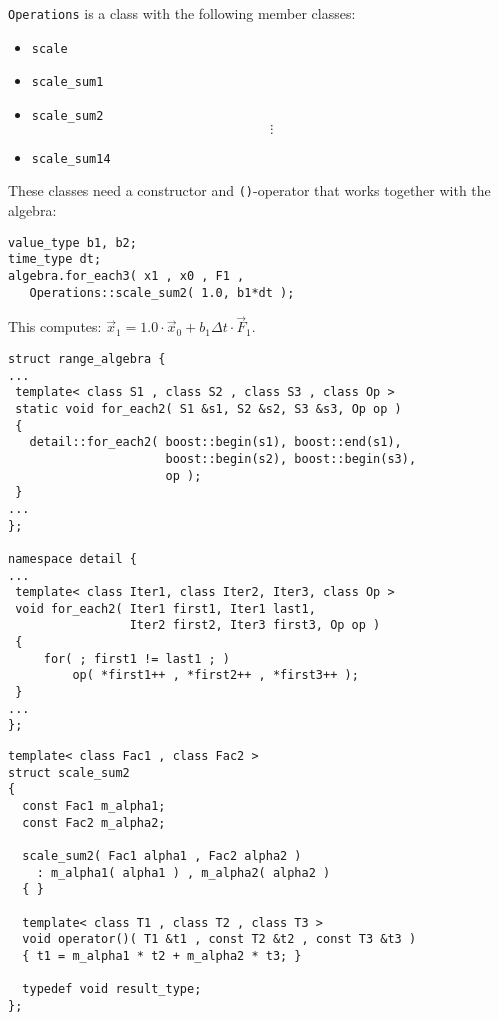 \begin{frame}[fragile]

\lstinline+Operations+ is a class with the following member classes:
\begin{itemize}
 \item \lstinline+scale+
 \item \lstinline+scale_sum1+
 \item \lstinline+scale_sum2+
\[ \vdots \]
 \item \lstinline+scale_sum14+
\end{itemize}

These classes need a constructor and \lstinline+()+-operator that works together with the algebra:
\begin{lstlisting}
value_type b1, b2;
time_type dt;
algebra.for_each3( x1 , x0 , F1 ,
   Operations::scale_sum2( 1.0, b1*dt );
\end{lstlisting}

This computes: $\vec x_1 = 1.0\cdot \vec x_0 + b_1\Delta t\cdot \vec F_1$.
\end{frame}


\begin{frame}[fragile]

\begin{lstlisting}[basicstyle=\scriptsize\ttfamily]
struct range_algebra {
...
 template< class S1 , class S2 , class S3 , class Op >
 static void for_each2( S1 &s1, S2 &s2, S3 &s3, Op op )
 {
   detail::for_each2( boost::begin(s1), boost::end(s1),
                      boost::begin(s2), boost::begin(s3), 
                      op );
 }
...
};

namespace detail {
...
 template< class Iter1, class Iter2, Iter3, class Op >
 void for_each2( Iter1 first1, Iter1 last1, 
                 Iter2 first2, Iter3 first3, Op op )
 {
     for( ; first1 != last1 ; )
         op( *first1++ , *first2++ , *first3++ );
 }
...
};
\end{lstlisting}

\end{frame}


\begin{frame}[fragile]
\begin{lstlisting}
template< class Fac1 , class Fac2 >
struct scale_sum2
{
  const Fac1 m_alpha1;
  const Fac2 m_alpha2;

  scale_sum2( Fac1 alpha1 , Fac2 alpha2 ) 
    : m_alpha1( alpha1 ) , m_alpha2( alpha2 ) 
  { }

  template< class T1 , class T2 , class T3 >
  void operator()( T1 &t1 , const T2 &t2 , const T3 &t3 )
  { t1 = m_alpha1 * t2 + m_alpha2 * t3; }

  typedef void result_type;
};
\end{lstlisting}

\end{frame}

